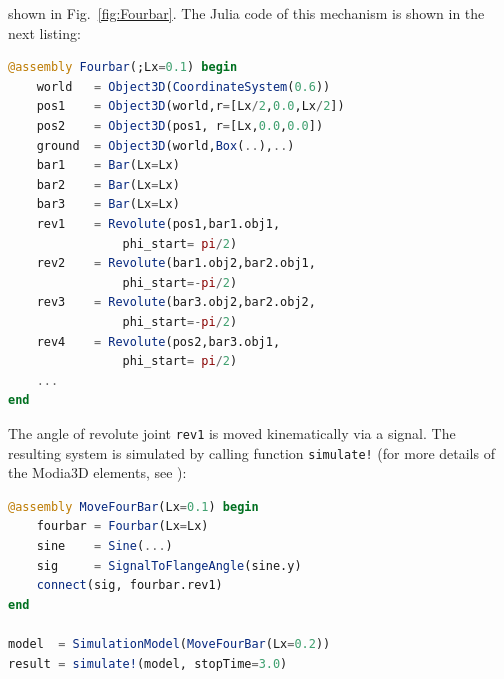 shown in Fig.~\ref{fig:Fourbar}.
The Julia code of this mechanism is shown in the next listing:
%
\begin{lstlisting}[language = Julia]
@assembly Fourbar(;Lx=0.1) begin
	world	= Object3D(CoordinateSystem(0.6)) 
	pos1 	= Object3D(world,r=[Lx/2,0.0,Lx/2]) 
	pos2 	= Object3D(pos1, r=[Lx,0.0,0.0]) 
	ground 	= Object3D(world,Box(..),..) 
	bar1	= Bar(Lx=Lx) 
	bar2	= Bar(Lx=Lx) 
	bar3	= Bar(Lx=Lx) 
	rev1	= Revolute(pos1,bar1.obj1,
				phi_start= pi/2) 
	rev2	= Revolute(bar1.obj2,bar2.obj1,				
				phi_start=-pi/2)	
	rev3	= Revolute(bar3.obj2,bar2.obj2, 			
				phi_start=-pi/2) 	
	rev4	= Revolute(pos2,bar3.obj1, 			
				phi_start= pi/2) 
	...
end
\end{lstlisting}
%
The angle of revolute joint \texttt{rev1} is moved kinematically via a signal. The resulting system
is simulated by calling function \texttt{simulate!} (for more details of 
the Modia3D elements, see \cite{Neumayr2018}):
% 
\begin{lstlisting}[language = Julia]
@assembly MoveFourBar(Lx=0.1) begin
	fourbar = Fourbar(Lx=Lx)
	sine 	= Sine(...)
	sig  	= SignalToFlangeAngle(sine.y)
	connect(sig, fourbar.rev1)
end

model  = SimulationModel(MoveFourBar(Lx=0.2))
result = simulate!(model, stopTime=3.0)
\end{lstlisting}
%
